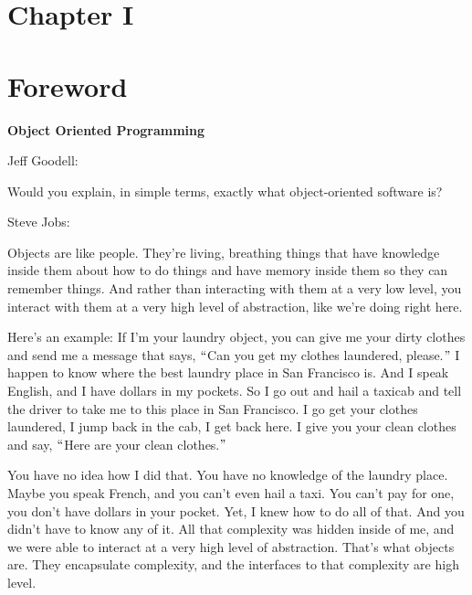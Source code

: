 \documentclass[12pt]{report}
\begin{document}

\newpage

\vspace{\baselineskip}
\vspace{\baselineskip}
\section*{Chapter I}
\section*{Foreword}

\vspace{\baselineskip}
\textbf{Object Oriented Programming}\par


\vspace{\baselineskip}
Jeff Goodell:\par

Would you explain, in simple terms, exactly what object-oriented software is?\par


\vspace{\baselineskip}
Steve Jobs:\par

Objects are like people. They’re living, breathing things that have knowledge inside them about how to do things and have memory inside them so they can remember things. And rather than interacting with them at a very low level, you interact with them at a very high level of abstraction, like we’re doing right here.\par


\vspace{\baselineskip}
Here’s an example: If I’m your laundry object, you can give me your dirty clothes and send me a message that says, $``$Can you get my clothes laundered, please.$"$  I happen to know where the best laundry place in San Francisco is. And I speak English, and I have dollars in my pockets. So I go out and hail a taxicab and tell the driver to take me to this place in San Francisco. I go get your clothes laundered, I jump back in the cab, I get back here. I give you your clean clothes and say, $``$Here are your clean clothes.$"$ \par


\vspace{\baselineskip}
You have no idea how I did that. You have no knowledge of the laundry place. Maybe you speak French, and you can’t even hail a taxi. You can’t pay for one, you don’t have dollars in your pocket. Yet, I knew how to do all of that. And you didn’t have to know any of it. All that complexity was hidden inside of me, and we were able to interact at a very high level of abstraction. That’s what objects are. They encapsulate complexity, and the interfaces to that complexity are high level.\par
\end{document}
